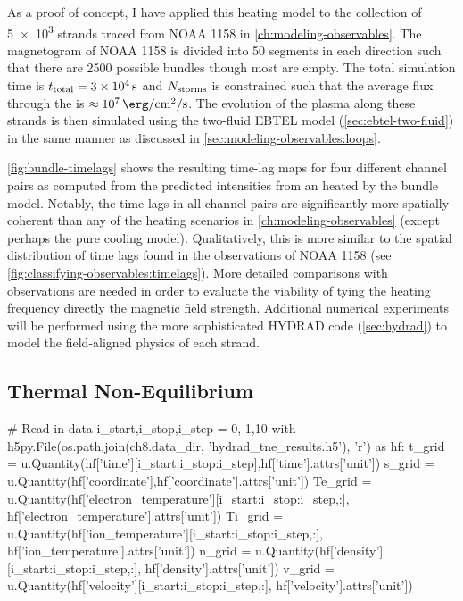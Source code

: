 As a proof of concept, I have applied this heating model to the collection of \num{5e3} strands traced from NOAA 1158 in \autoref{ch:modeling-observables}. The magnetogram of NOAA 1158 is divided into 50 segments in each direction such that there are 2500 possible bundles though most are empty. The total simulation time is $t_\textup{total}=\SI{3e4}{\second}$ and $N_\textup{storms}$ is constrained such that the average flux through the \AR{} is $\approx\SI{e7}{\erg\per\square\cm\per\second}$. The evolution of the plasma along these strands is then simulated using the two-fluid EBTEL model (\autoref{sec:ebtel-two-fluid}) in the same manner as discussed in \autoref{sec:modeling-observables:loops}.

\autoref{fig:bundle-timelags} shows the resulting time-lag maps for four different channel pairs as computed from the predicted intensities from an \AR{} heated by the bundle model. Notably, the time lags in all channel pairs are significantly more spatially coherent than any of the heating scenarios in \autoref{ch:modeling-observables} (except perhaps the pure cooling model). Qualitatively, this is more similar to the spatial distribution of time lags found in the observations of NOAA 1158 (see \autoref{fig:classifying-observables:timelags}). More detailed comparisons with observations are needed in order to evaluate the viability of tying the heating frequency directly the magnetic field strength. Additional numerical experiments will be performed using the more sophisticated HYDRAD code (\autoref{sec:hydrad}) to model the field-aligned physics of each strand.

\subsection{Thermal Non-Equilibrium}\label{sec:tne}

\begin{pycode}[chapter8]
# Read in data
i_start,i_stop,i_step = 0,-1,10
with h5py.File(os.path.join(ch8.data_dir, 'hydrad_tne_results.h5'), 'r') as hf:
    t_grid = u.Quantity(hf['time'][i_start:i_stop:i_step],hf['time'].attrs['unit'])
    s_grid = u.Quantity(hf['coordinate'],hf['coordinate'].attrs['unit'])
    Te_grid = u.Quantity(hf['electron_temperature'][i_start:i_stop:i_step,:],
                         hf['electron_temperature'].attrs['unit'])
    Ti_grid = u.Quantity(hf['ion_temperature'][i_start:i_stop:i_step,:],
                         hf['ion_temperature'].attrs['unit'])
    n_grid = u.Quantity(hf['density'][i_start:i_stop:i_step,:],
                        hf['density'].attrs['unit'])
    v_grid = u.Quantity(hf['velocity'][i_start:i_stop:i_step,:],
                        hf['velocity'].attrs['unit'])
\end{pycode}

